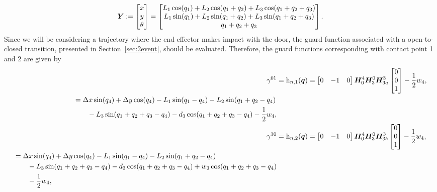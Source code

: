 \documentclass[../DC2017114Bouma.tex]{subfiles}
\begin{document}
\begin{align}
{\boldsymbol{Y}}:=\begin{bmatrix}
x\\y\\ \theta
\end{bmatrix} = \begin{bmatrix}
L_1\cos(q_1) + L_2\cos(q_1+q_2) + L_3\cos(q_1+q_2+q_3)\\
L_1\sin(q_1) + L_2\sin(q_1+q_2) + L_3\sin(q_1+q_2+q_3)\\
q_1+q_2+q_3
\end{bmatrix}.\label{eq:Y}
\end{align}
%
Since we will be considering a trajectory where the end effector makes impact with the door, the guard function associated with a open-to-closed transition, presented in Section~\ref{sec:2event}, should be evaluated. Therefore, the guard functions corresponding with contact point 1 and 2 are given by
\begin{align}
\gamma^{01} &= \mathrm{h}_{n,1}({\boldsymbol{q}}) = \begin{bmatrix} 0 & -1 & 0\end{bmatrix}{\boldsymbol{H}}^4_0{\boldsymbol{H}}^0_3{\boldsymbol{H}}^3_{3a}\begin{bmatrix}0\\0\\1\end{bmatrix}-\frac{1}{2}w_4,\\
\begin{split}
&= \Delta x\sin(q_4) + \Delta y\cos(q_4) - L_1\sin(q_1-q_4) - L_2\sin(q_1+q_2-q_4) \\
&\qquad -L_3\sin(q_1+q_2+q_3-q_4) - d_3\cos(q_1+q_2+q_3-q_4) - \frac{1}{2}w_4,
\end{split}\\
\gamma^{10} &= \mathrm{h}_{n,2}({\boldsymbol{q}}) = \begin{bmatrix} 0 & -1 & 0\end{bmatrix}{\boldsymbol{H}}^4_0{\boldsymbol{H}}^0_3{\boldsymbol{H}}^3_{3b}\begin{bmatrix}0\\0\\1\end{bmatrix}-\frac{1}{2}w_4,\\
\begin{split}
&= \Delta x\sin(q_4) + \Delta y\cos(q_4) - L_1\sin(q_1-q_4) - L_2\sin(q_1+q_2-q_4) \\
&\qquad -L_3\sin(q_1+q_2+q_3-q_4) - d_3\cos(q_1+q_2+q_3-q_4) + w_3\cos(q_1+q_2+q_3-q_4) \\ &\qquad-\frac{1}{2}w_4,
\end{split}
\end{align}
\end{document}
